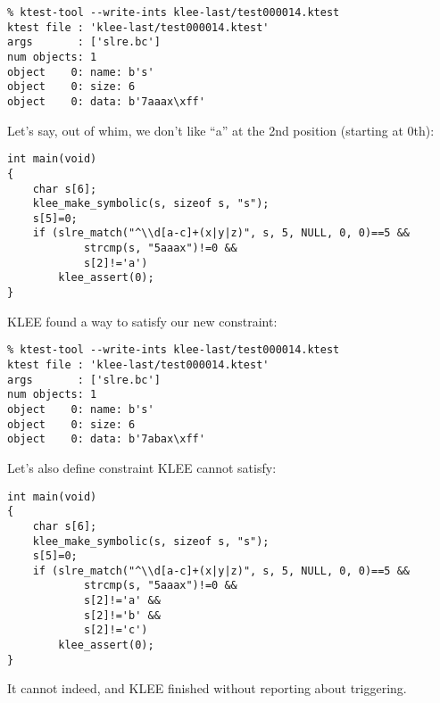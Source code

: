 \begin{lstlisting}
% ktest-tool --write-ints klee-last/test000014.ktest
ktest file : 'klee-last/test000014.ktest'
args       : ['slre.bc']
num objects: 1
object    0: name: b's'
object    0: size: 6
object    0: data: b'7aaax\xff'
\end{lstlisting}

Let's say, out of whim, we don't like ``a'' at the 2nd position (starting at 0th):

\begin{lstlisting}
int main(void)
{
	char s[6];
	klee_make_symbolic(s, sizeof s, "s");
	s[5]=0;
	if (slre_match("^\\d[a-c]+(x|y|z)", s, 5, NULL, 0, 0)==5 &&
			strcmp(s, "5aaax")!=0 &&
			s[2]!='a')
		klee_assert(0);
}
\end{lstlisting}

KLEE found a way to satisfy our new constraint:

\begin{lstlisting}
% ktest-tool --write-ints klee-last/test000014.ktest
ktest file : 'klee-last/test000014.ktest'
args       : ['slre.bc']
num objects: 1
object    0: name: b's'
object    0: size: 6
object    0: data: b'7abax\xff'
\end{lstlisting}

Let's also define constraint KLEE cannot satisfy:

\begin{lstlisting}
int main(void)
{
	char s[6];
	klee_make_symbolic(s, sizeof s, "s");
	s[5]=0;
	if (slre_match("^\\d[a-c]+(x|y|z)", s, 5, NULL, 0, 0)==5 &&
			strcmp(s, "5aaax")!=0 &&
			s[2]!='a' &&
			s[2]!='b' &&
			s[2]!='c')
		klee_assert(0);
}
\end{lstlisting}

It cannot indeed, and KLEE finished without reporting about  triggering.

